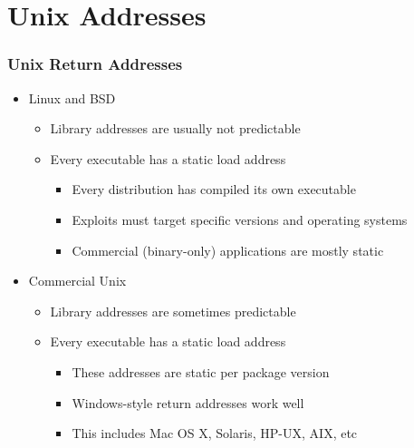 \documentclass{beamer}
\newenvironment{sitemize}{\vspace{1mm}\begin{itemize}\itemsep 4pt\small}{\end{itemize}}
\begin{document}
\section{Unix Addresses}
\begin{frame}[t]
	\frametitle{Unix Return Addresses}
	
	\begin{sitemize}
		\item Linux and BSD	
		\begin{sitemize}
			\item Library addresses are usually not predictable
			\item Every executable has a static load address
			\begin{sitemize}
				\item Every distribution has compiled its own executable
				\item Exploits must target specific versions and operating systems
				\item Commercial (binary-only) applications are mostly static
			\end{sitemize}
		\end{sitemize}
	\end{sitemize}
	
	\pause
	\begin{sitemize}
		\item Commercial Unix
		\begin{sitemize}
			\item Library addresses are sometimes predictable
			\item Every executable has a static load address
			\begin{sitemize}
				\item These addresses are static per package version
				\item Windows-style return addresses work well
				\item This includes Mac OS X, Solaris, HP-UX, AIX, etc
			\end{sitemize}
		\end{sitemize}
	\end{sitemize}
\end{frame}
\end{document}
